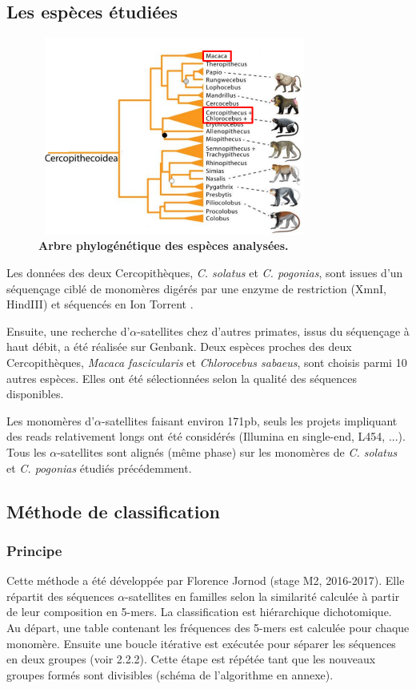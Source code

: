 \documentclass[12pt,a4paper]{article}
\begin{document}
\subsection{Les espèces étudiées}

	\begin{figure}[!h]
		\center
		\includegraphics[height=6.5cm, width=9cm]{img/arbre_presentation.png}
		\caption{\textbf{Arbre phylogénétique des espèces analysées.}\cite{Springer2012}
		\label{fig:arbre_presentation}}
	\end{figure}

Les données des deux Cercopithèques, \textit{C. solatus} et \textit{C. pogonias}, sont issues d'un séquençage ciblé de monomères digérés par une enzyme de restriction (XmnI, HindIII) et séquencés en Ion Torrent \cite{Benjak2015}. 

Ensuite, une recherche d'$\alpha$-satellites chez d'autres primates, issus du séquençage à haut débit, a été réalisée sur Genbank. Deux espèces proches des deux Cercopithèques, \textit{Macaca fascicularis} et \textit{Chlorocebus sabaeus},  sont choisis parmi 10 autres espèces. Elles ont été sélectionnées selon la qualité des séquences disponibles.

Les monomères d'$\alpha$-satellites faisant environ 171pb,  seuls les projets impliquant des reads relativement longs ont été considérés (Illumina en single-end, L454, ...). Tous les $\alpha$-satellites sont alignés (même phase) sur les monomères de \textit{C. solatus} et \textit{C. pogonias} étudiés précédemment.

\subsection{Méthode de classification}
	\subsubsection{Principe}
Cette méthode a été développée par Florence Jornod (stage M2, 2016-2017). Elle répartit des séquences $\alpha$-satellites en familles selon la similarité calculée à partir de leur composition en 5-mers. La classification est hiérarchique dichotomique. Au départ, une table contenant les fréquences des 5-mers est calculée pour chaque monomère. Ensuite une boucle itérative est exécutée pour séparer les séquences en deux groupes (voir 2.2.2). Cette étape est répétée tant que les nouveaux groupes formés sont divisibles (schéma de l'algorithme en annexe).
\end{document}
